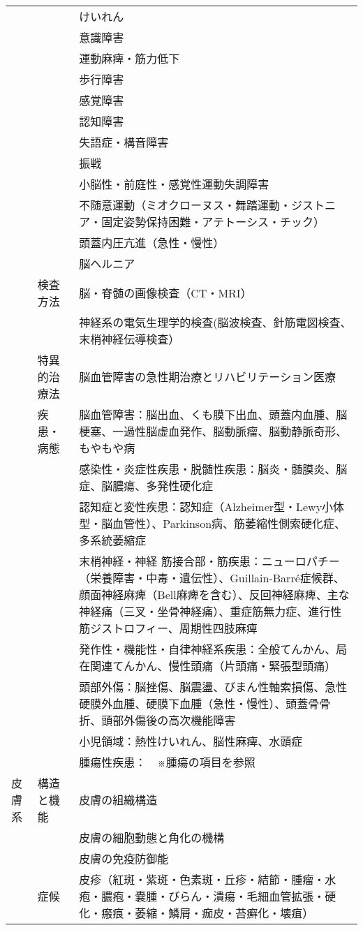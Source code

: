 \begin{xltabular}{\linewidth}{XXX}
 &  & けいれん \\
 &  & 意識障害 \\
 &  & 運動麻痺・筋力低下 \\
 &  & 歩行障害 \\
 &  & 感覚障害 \\
 &  & 認知障害 \\
 &  & 失語症・構音障害 \\
 &  & 振戦 \\
 &  & 小脳性・前庭性・感覚性運動失調障害 \\
 &  & 不随意運動（ミオクローヌス・舞踏運動・ジストニア・固定姿勢保持困難・アテトーシス・チック） \\
 &  & 頭蓋内圧亢進（急性・慢性） \\
 &  & 脳ヘルニア \\
 & 検査方法 & 脳・脊髄の画像検査（CT・MRI） \\
 &  & 神経系の電気生理学的検査(脳波検査、針筋電図検査、末梢神経伝導検査） \\
 & 特異的治療法 & 脳血管障害の急性期治療とリハビリテーション医療 \\
 & 疾患・病態 & 脳血管障害：脳出血、くも膜下出血、頭蓋内血腫、脳梗塞、一過性脳虚血発作、脳動脈瘤、脳動静脈奇形、もやもや病 \\
 &  & 感染性・炎症性疾患・脱髄性疾患：脳炎・髄膜炎、脳症、脳膿瘍、多発性硬化症 \\
 &  & 認知症と変性疾患：認知症（Alzheimer型・Lewy小体型・脳血管性）、Parkinson病、筋萎縮性側索硬化症、多系統萎縮症 \\
 &  & 末梢神経・神経 筋接合部・筋疾患：ニューロパチー（栄養障害・中毒・遺伝性）、Guillain-Barré症候群、顔面神経麻痺（Bell麻痺を含む）、反回神経麻痺、主な神経痛（三叉・坐骨神経痛）、重症筋無力症、進行性筋ジストロフィー、周期性四肢麻痺 \\
 &  & 発作性・機能性・自律神経系疾患：全般てんかん、局在関連てんかん、慢性頭痛（片頭痛・緊張型頭痛） \\
 &  & 頭部外傷：脳挫傷、脳震盪、びまん性軸索損傷、急性硬膜外血腫、硬膜下血腫（急性・慢性）、頭蓋骨骨折、頭部外傷後の高次機能障害 \\
 &  & 小児領域：熱性けいれん、脳性麻痺、水頭症 \\
 &  & 腫瘍性疾患：　※腫瘍の項目を参照 \\
皮膚系 & 構造と機能 & 皮膚の組織構造 \\
 &  & 皮膚の細胞動態と角化の機構 \\
 &  & 皮膚の免疫防御能 \\
 & 症候 & 皮疹（紅斑・紫斑・色素斑・丘疹・結節・腫瘤・水疱・膿疱・嚢腫・びらん・潰瘍・毛細血管拡張・硬化・瘢痕・萎縮・鱗屑・痂皮・苔癬化・壊疽） \\

\end{xltabular}
